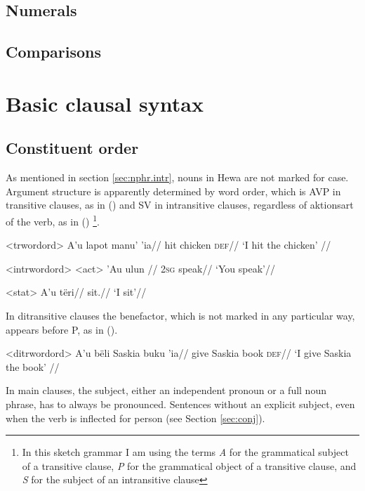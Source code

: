 \documentclass[12pt]{article}
\begin{document}
\subsection{Numerals}

\subsection{Comparisons}

\section{Basic clausal syntax}

\subsection{Constituent order}

As mentioned in section \ref{sec:nphr.intr}, nouns in Hewa are not marked for case. Argument structure is apparently determined by word order, which is AVP in transitive clauses, as in () and SV in intransitive clauses, regardless of aktionsart of the verb, as in () \footnote{In this sketch grammar I am using the terms \textit{A} for the grammatical subject of a transitive clause, \textit{P} for the grammatical object of a transitive clause, and \textit{S} for the subject of an intransitive clause}.

\ex<trwordord>
\begingl %
\gla A'u lapot manu' 'ia//
\glb \First{}\Sg{} hit chicken \textsc{def}//
\glft `I hit the chicken' // 
\endgl
\xe

\pex<intrwordord> %
\a<act> %
\begingl %
\gla 'Au ulun //
\glb \textsc{2sg} speak//
\glft `You speak'//
\endgl

\a<stat> %
\begingl %
\gla A'u tëri//
\glb \First{}\Sg{} sit.\First{}\Sg//
\glft `I sit'// 
\endgl
\xe

In ditransitive clauses the benefactor, which is not marked in any particular way, appears before P, as in ().

\ex<ditrwordord>
\begingl %
\gla A'u bëli Saskia buku 'ia//
\glb \First{}\Sg{} give Saskia book \textsc{def}//
\glft `I give Saskia the book' // 
\endgl
\xe 

In main clauses, the subject, either an independent pronoun or a full noun phrase, has to always be pronounced. Sentences without an explicit subject, even when the verb is inflected for person (see Section \ref{sec:conj}).
\end{document}
